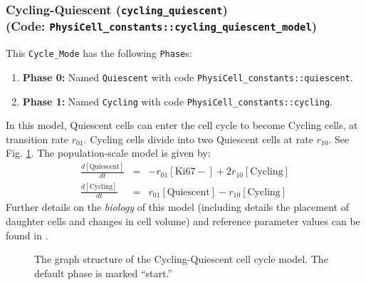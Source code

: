 \documentclass[12pt]{article}
\newcommand{\beqa}{\begin{eqnarray}}
\newcommand{\eeqa}{\end{eqnarray}}
\renewcommand{\v}{\verb}
\renewcommand{\t}[1]{\left[\mathrm{#1}\right]}
\begin{document}
\subsubsection{Cycling-Quiescent (\texttt{cycling\_quiescent})\\
(Code: \texttt{PhysiCell\_constants::cycling\_quiescent\_model})}
\label{sec:Standard_Models:cycling_quiescent}
This \v|Cycle_Mode| has the following \v|Phase|s: 
\begin{enumerate}
\item 
\textbf{Phase 0:} Named \v|Quiescent| with code \v|PhysiCell_constants::quiescent|. 

\item 
\textbf{Phase 1:} Named \v|Cycling| with code \v|PhysiCell_constants::cycling|. 
\end{enumerate}

In this model, Quiescent cells can enter the cell cycle to 
become Cycling cells, at transition rate $r_{01}$. Cycling cells 
divide into two Quiescent cells at rate $r_{10}$. 
See Fig. \ref{fig:cycle_model:cycling_quiescent}. The 
population-scale model is given by: 
\beqa
\frac{d\t{Quiescent}}{dt} & = & -r_{01} \t{Ki67-} + 2 r_{10} \t{Cycling} \\
\frac{d\t{Cycling}}{dt} & = &  r_{01} \t{Quiescent} -r_{10} \t{Cycling} 
\eeqa
Further details on the \emph{biology} of this model (including 
details the placement of daughter cells and changes in cell 
volume) and reference parameter values can be found in \cite{ref:PhysiCell}. 

\begin{figure}
\begin{mdframed}[style=mystyle]
\caption{The graph structure of the Cycling-Quiescent cell cycle model. The default phase is marked 
``start.''}
\label{fig:cycle_model:cycling_quiescent}
\end{mdframed}
\end{figure}
\end{document}
